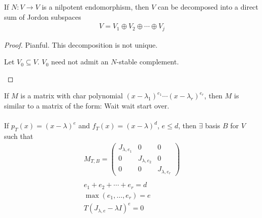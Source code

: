 \documentclass[class=scrartcl, crop=false]{standalone}
\begin{document}
\begin{theorem}
  If $N: V \to V$ is a nilpotent endomorphism, then $V$ can be decomposed into a direct sum of Jordon subspaces
  \begin{gather*}
    V = V_1 \oplus V_2 \oplus \cdots \oplus V_j
  \end{gather*} 
  \begin{proof}
    Pianful. This decomposition is not unique. 
    \begin{remark}
      Let $V_0 \subseteq V$. $V_0$ need not admit an $N$-stable complement.
    \end{remark} 
  \end{proof} 
\end{theorem} 
\begin{theorem}
  If $M$ is a matrix with char polynomial $(x - \lambda_1)^{e_1}\cdots(x - \lambda_r)^{e_r}$, then $M$ is similar to a matrix of the form: Wait wait start over.
  \\\\
  If $p_T(x) = (x - \lambda)^e$ and $f_T(x) = (x - \lambda)^d$, $e \leq d$, then $\exists$ basis $B$ for $V$ such that 
  \begin{gather*}
    M_{T, B} = 
    \begin{pmatrix}
      J_{\lambda, e_1} & 0 & 0 \\
      0 & J_{\lambda, e_2} & 0 \\
      0 & 0 & J_{\lambda, e_r}
    \end{pmatrix} 
    \\\\
    e_1 + e_2 + \cdots + e_r = d \\
    \max{(e_{1}, \dots, e_r)} = e \\
    T(J_{\lambda, e} - \lambda I)^e = 0
  \end{gather*} 
\end{theorem} 
\end{document}
